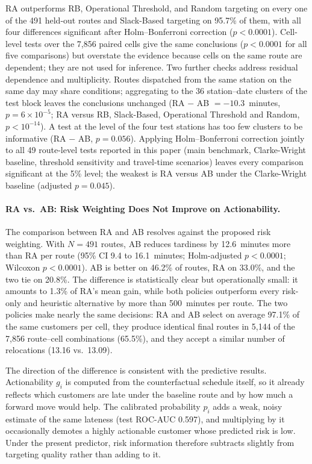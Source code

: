 \documentclass[11pt,a4paper]{article}
\begin{document}
RA outperforms RB, Operational Threshold, and Random targeting on every one of the 491 held-out routes and Slack-Based targeting on 95.7\% of them, with all four differences significant after Holm--Bonferroni correction ($p < 0.0001$). Cell-level tests over the 7,856 paired cells give the same conclusions ($p < 0.0001$ for all five comparisons) but overstate the evidence because cells on the same route are dependent; they are not used for inference. Two further checks address residual dependence and multiplicity. Routes dispatched from the same station on the same day may share conditions; aggregating to the 36 station--date clusters of the test block leaves the conclusions unchanged (RA $-$ AB $= -10.3$~minutes, $p = 6 \times 10^{-5}$; RA versus RB, Slack-Based, Operational Threshold and Random, $p < 10^{-14}$). A test at the level of the four test stations has too few clusters to be informative (RA $-$ AB, $p = 0.056$). Applying Holm--Bonferroni correction jointly to all 49 route-level tests reported in this paper (main benchmark, Clarke-Wright baseline, threshold sensitivity and travel-time scenarios) leaves every comparison significant at the 5\% level; the weakest is RA versus AB under the Clarke-Wright baseline (adjusted $p = 0.045$).

\paragraph{RA vs.\ AB: Risk Weighting Does Not Improve on Actionability.}
The comparison between RA and AB resolves against the proposed risk weighting. With $N = 491$ routes, AB reduces tardiness by 12.6~minutes more than RA per route (95\% CI 9.4 to 16.1~minutes; Holm-adjusted $p < 0.0001$; Wilcoxon $p < 0.0001$). AB is better on 46.2\% of routes, RA on 33.0\%, and the two tie on 20.8\%. The difference is statistically clear but operationally small: it amounts to 1.3\% of RA's mean gain, while both policies outperform every risk-only and heuristic alternative by more than 500~minutes per route. The two policies make nearly the same decisions: RA and AB select on average 97.1\% of the same customers per cell, they produce identical final routes in 5,144 of the 7,856 route--cell combinations (65.5\%), and they accept a similar number of relocations (13.16 vs.\ 13.09).

The direction of the difference is consistent with the predictive results. Actionability $g_i$ is computed from the counterfactual schedule itself, so it already reflects which customers are late under the baseline route and by how much a forward move would help. The calibrated probability $p_i$ adds a weak, noisy estimate of the same lateness (test ROC-AUC 0.597), and multiplying by it occasionally demotes a highly actionable customer whose predicted risk is low. Under the present predictor, risk information therefore subtracts slightly from targeting quality rather than adding to it.
\end{document}

